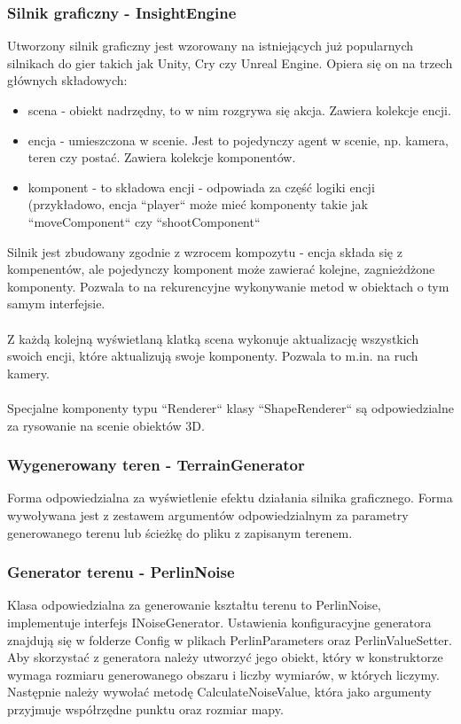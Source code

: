 \documentclass[12pt,a4paper]{article}
\begin{document}
\subsubsection{Silnik graficzny - InsightEngine}
Utworzony silnik graficzny jest wzorowany na istniejących już popularnych silnikach do gier takich jak Unity, Cry czy Unreal Engine. Opiera się on na trzech głównych składowych: \begin{itemize}
\item scena - obiekt nadrzędny, to w nim rozgrywa się akcja. Zawiera kolekcje encji.
\item encja - umieszczona w scenie. Jest to pojedynczy agent w scenie, np. kamera, teren czy postać. Zawiera kolekcje komponentów.
\item komponent - to składowa encji - odpowiada za część logiki encji (przykładowo, encja ``player`` może mieć komponenty takie jak ``moveComponent`` czy ``shootComponent``
\\
\end{itemize}
Silnik jest zbudowany zgodnie z wzrocem kompozytu - encja składa się z kompenentów, ale pojedynczy komponent może zawierać kolejne, zagnieżdżone komponenty. Pozwala to na rekurencyjne wykonywanie metod w obiektach o tym samym interfejsie. \\ \\
Z każdą kolejną wyświetlaną klatką scena wykonuje aktualizację wszystkich swoich encji, które aktualizują swoje komponenty. Pozwala to m.in. na ruch kamery. \\ \\
Specjalne komponenty typu ``Renderer`` klasy ``ShapeRenderer`` są odpowiedzialne za rysowanie na scenie obiektów 3D.


\subsubsection{Wygenerowany teren - TerrainGenerator}
Forma odpowiedzialna za wyświetlenie efektu działania silnika graficznego. Forma wywoływana jest z zestawem argumentów odpowiedzialnym za parametry generowanego terenu lub ścieżkę do pliku z zapisanym terenem.
\subsubsection{Generator terenu - PerlinNoise}
Klasa odpowiedzialna za generowanie kształtu terenu to PerlinNoise, implementuje interfejs INoiseGenerator. Ustawienia konfiguracyjne generatora znajdują się w folderze Config w plikach PerlinParameters oraz PerlinValueSetter.
Aby skorzystać z generatora należy utworzyć jego obiekt, który w konstruktorze wymaga rozmiaru generowanego obszaru i liczby wymiarów, w których liczymy. Następnie należy wywołać metodę CalculateNoiseValue, która jako argumenty przyjmuje współrzędne punktu oraz rozmiar mapy. 
\end{document}
